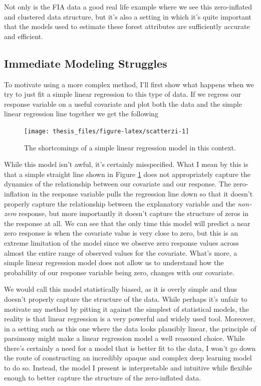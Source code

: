 \documentclass[12pt,twoside]{reedthesis}
\begin{document}
Not only is the FIA data a good real life example where we see this zero-inflated and clustered data structure, but it's also a setting in which it's quite important that the models used to estimate these forest attributes are sufficiently accurate and efficient.

\hypertarget{immediate-modeling-struggles}{%
\subsection{Immediate Modeling Struggles}\label{immediate-modeling-struggles}}

To motivate using a more complex method, I'll first show what happens when we try to just fit a simple linear regression to this type of data. If we regress our response variable on a useful covariate and plot both the data and the simple linear regression line together we get the following
\begin{figure}

{\centering \texttt{[image: thesis\_files/figure-latex/scatterzi-1]} 

}

\caption{The shortcomings of a simple linear regression model in this context.}\label{fig:scatterzi}
\end{figure}
While this model isn't awful, it's certainly misspecified. What I mean by this is that a simple straight line shown in Figure \ref{fig:scatterzi} does not appropriately capture the dynamics of the relationship between our covariate and our response. The zero-inflation in the response variable pulls the regression line down so that it doesn't properly capture the relationship between the explanatory variable and the \emph{non-zero} response, but more importantly it doesn't capture the structure of zeros in the response at all. We can see that the only time this model will predict a near zero response is when the covariate value is very close to zero, but this is an extreme limitation of the model since we observe zero response values across almost the entire range of observed values for the covariate. What's more, a simple linear regression model does not allow us to understand how the probability of our response variable being zero, changes with our covariate.

We would call this model statistically biased, as it is overly simple and thus doesn't properly capture the structure of the data. While perhaps it's unfair to motivate my method by pitting it against the simplest of statistical models, the reality is that linear regression is a very powerful and widely used tool. Moreover, in a setting such as this one where the data looks plausibly linear, the principle of parsimony might make a linear regression model a well reasoned choice. While there's certainly a need for a model that is better fit to the data, I won't go down the route of constructing an incredibly opaque and complex deep learning model to do so. Instead, the model I present is interpretable and intuitive while flexible enough to better capture the structure of the zero-inflated data.
\end{document}
